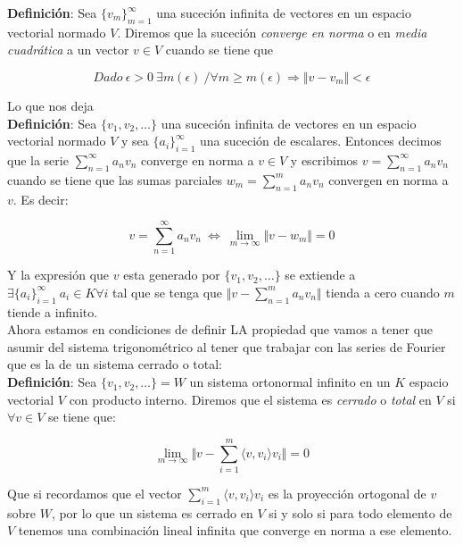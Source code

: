 \documentclass[a4paper,spanish]{article}
\numberwithin{equation}{section}
\begin{document}
\textbf{Definici\'on}: Sea  $\lbrace{v_m}\rbrace_{m=1}^{\infty}$ una suceci\'on infinita de vectores en un espacio vectorial normado $V$. Diremos que la suceci\'on \textit{converge en norma} o en \textit{media cuadr\'atica} a un vector $v \in V$ cuando se tiene que

\[
{Dado} \ \epsilon >0 \ \exists m\left({\epsilon}\right) \ /\forall m\geq m\left({\epsilon}\right) \Longrightarrow \Vert{v-v_m}\Vert < \epsilon \]

Lo que nos deja\\

\textbf{Definici\'on}: Sea $\lbrace{v_1,v_2,\dots}\rbrace$ una suceci\'on infinita de vectores en un espacio vectorial normado $V$ y sea $\lbrace{a_i}\rbrace_{i=1}^{\infty}$ una suceci\'on de escalares. Entonces decimos que la serie $\sum \limits _{n=1}^{\infty} {a_nv_n}$ converge en norma a $v \in V$ y escribimos $v=\sum \limits _{n=1}^{\infty} {a_nv_n}$ cuando se tiene que las sumas parciales $w_m=\sum \limits _{n=1}^{m} {a_nv_n}$ convergen en norma a $v$. Es decir:

\[ v = \sum \limits _{n=1}^{\infty} {a_n v_n} \  \Longleftrightarrow \ \lim \limits _{m \rightarrow \infty}{\Vert{v-w_m}\Vert}=0\]

Y la expresi\'on que $v$ esta generado por $\lbrace{v_1,v_2,\dots}\rbrace$ se extiende a $\exists \lbrace{a_i}\rbrace_{i=1}^{\infty} \ a_i\in K \forall i $ tal que se tenga que $\Vert{v- \sum \limits _{n=1}^{m} {a_nv_n}}\Vert$ tienda a cero cuando $m$ tiende a infinito. \\
Ahora estamos en condiciones de definir LA propiedad que vamos a tener que asumir del sistema trigonom\'etrico al tener que trabajar con las series de Fourier que es la de un sistema cerrado o total:\\

\textbf{Definici\'on}: Sea $\lbrace{v_1,v_2,\dots}\rbrace = W$ un sistema ortonormal infinito en un $K$ espacio vectorial $V$ con producto interno. Diremos que el sistema es \textit{cerrado} o \textit{total} en $V$ si $\forall v \in V$ se tiene que:

\[\lim \limits _{m \rightarrow \infty}{\Vert{v- \sum \limits _{i=1}^{m}{\langle{v,v_i}\rangle v_i}}\Vert}=0\]

Que si recordamos que el vector $\sum \limits _{i=1}^{m}{\langle{v,v_i}\rangle v_i}$ es la proyecci\'on ortogonal de $v$ sobre $W$, por lo que un sistema es cerrado en $V$ si y solo si para todo elemento de $V$ tenemos una combinaci\'on lineal infinita que converge en norma a ese elemento.\\
\end{document}

